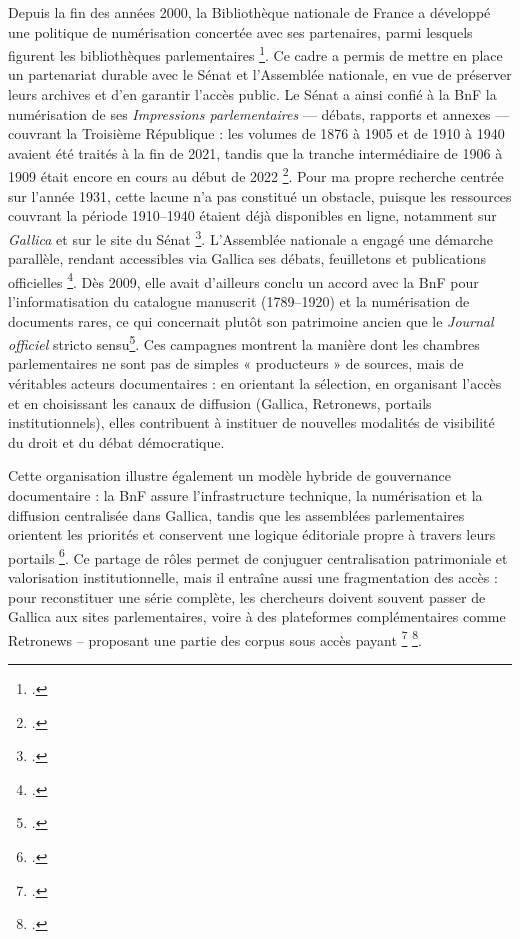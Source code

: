 Depuis la fin des années 2000, la Bibliothèque nationale de France a développé une politique de numérisation concertée avec ses partenaires, parmi lesquels figurent les bibliothèques parlementaires \footcite[][]{bnfpolitiquenum}. Ce cadre a permis de mettre en place un partenariat durable avec le Sénat et l’Assemblée nationale, en vue de préserver leurs archives et d’en garantir l’accès public. Le Sénat a ainsi confié à la BnF la numérisation de ses \emph{Impressions parlementaires} — débats, rapports et annexes — couvrant la Troisième République : les volumes de 1876 à 1905 et de 1910 à 1940 avaient été traités à la fin de 2021, tandis que la tranche intermédiaire de 1906 à 1909 était encore en cours au début de 2022 \footcite[][]{senat}. Pour ma propre recherche centrée sur l’année 1931, cette lacune n’a pas constitué un obstacle, puisque les ressources couvrant la période 1910–1940 étaient déjà disponibles en ligne, notamment sur \emph{Gallica} et sur le site du Sénat \footcite[][]{bnflibguide}. L’Assemblée nationale a engagé une démarche parallèle, rendant accessibles via Gallica ses débats, feuilletons et publications officielles \footcite[][]{bnflibguide}. Dès 2009, elle avait d’ailleurs conclu un accord avec la BnF pour l’informatisation du catalogue manuscrit (1789–1920) et la numérisation de documents rares, ce qui concernait plutôt son patrimoine ancien que le \emph{Journal officiel} stricto sensu\footcite[][]{wikipediaan}. Ces campagnes montrent la manière dont les chambres parlementaires ne sont pas de simples « producteurs » de sources, mais de véritables acteurs documentaires : en orientant la sélection, en organisant l’accès et en choisissant les canaux de diffusion (Gallica, Retronews, portails institutionnels), elles contribuent à instituer de nouvelles modalités de visibilité du droit et du débat démocratique.

Cette organisation illustre également un modèle hybride de gouvernance documentaire : la BnF assure l’infrastructure technique, la numérisation et la diffusion centralisée dans Gallica, tandis que les assemblées parlementaires orientent les priorités et conservent une logique éditoriale propre à travers leurs portails \footcite[][]{bnflibguide}. Ce partage de rôles permet de conjuguer centralisation patrimoniale et valorisation institutionnelle, mais il entraîne aussi une fragmentation des accès : pour reconstituer une série complète, les chercheurs doivent souvent passer de Gallica aux sites parlementaires, voire à des plateformes complémentaires comme Retronews -- proposant une partie des corpus sous accès payant \footcite[][]{ruiz}  \footcite[][]{wikipediabnfpart}.

